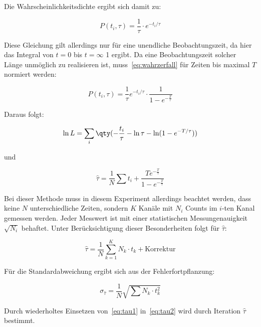 \documentclass[slug=LM, room=Andreas-Schubert-Bau\,\ K\ 1A, supervisor=Anne-Sophie\ Berthold, coursedate=13.\ 12.\ 2019]{../../Lab_Report_LaTeX/lab_report}
\begin{document}
Die Wahrscheinlichkeitsdichte ergibt sich damit zu:

\begin{equation}\label{eq:wahrzerfall}
 P(t_i,\tau) = \frac{1}{\tau} \cdot e^{-t_i/\tau}
\end{equation}

Diese Gleichung gilt allerdings nur für eine unendliche Beobachtungszeit, da hier das Integral
von \(t = 0\) bis \(t = \infty\) 1 ergibt.
Da eine Beobachtungszeit solcher Länge unmöglich zu realisieren ist, muss~\ref{eq:wahrzerfall}
für Zeiten bis maximal \(T\) normiert werden:

\begin{equation}\label{eq:modzerfall}
 P(t_i,\tau) = \frac{1}{\tau}e^{-t_i/\tau} \cdot \frac{1}{1-e^{-\frac{T}{\tau}}}
\end{equation}

Daraus folgt:

\begin{equation}\label{eq:delta-tau}
 \ln L = \sum_i \qty(-\frac{t_i}{\tau} - \ln\tau - \ln(1-e^{-T/\tau}))
\end{equation}

und

\begin{equation}\label{eq:tau2}
 \hat\tau = \frac{1}{N} \sum t_i + \frac{T e^{-\frac{T}{\tau}}}{1-e^{-\frac{T}{\tau}}}
\end{equation}

Bei dieser Methode muss in diesem Experiment allerdings beachtet werden, dass keine \(N\)
unterschiedliche Zeiten, sondern \(K\) Kanäle mit \(N_i\) Counts im \(i\)-ten Kanal gemessen
werden. Jeder Messwert ist mit einer statistischen Messungenauigkeit \(\sqrt{N_i}\) behaftet.
Unter Berücksichtigung dieser Besonderheiten folgt für \(\hat\tau\):

\begin{equation}\label{eq:tau1}
 \hat\tau = \frac{1}{N} \sum_{k=1}^{K}N_k\cdot t_k + \text{Korrektur}
\end{equation}

Für die Standardabweichung ergibt sich aus der Fehlerfortpflanzung:

\begin{equation}\label{key}
 \sigma_{\hat\tau} = \frac{1}{N} \sqrt{\sum N_k \cdot t_k^2}
\end{equation}

Durch wiederholtes Einsetzen von~\ref{eq:tau1} in~\ref{eq:tau2} wird durch Iteration \(\hat\tau\)
bestimmt.
\end{document}
